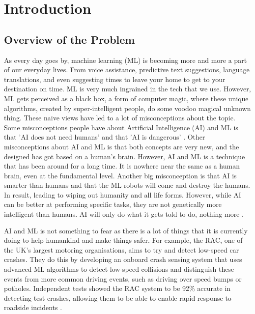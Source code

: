 \chapter{Introduction}
	\label{chap:intro}
	
	\section{Overview of the Problem}
		\label{sec:overview_of_problem}
		As every day goes by, machine learning (ML) is becoming more and more a part of our everyday lives. From voice assistance, predictive text suggestions, language translations, and even suggesting times to leave your home to get to your destination on time. ML is very much ingrained in the tech that we use. However, ML gets perceived as a black box, a form of computer magic, where these unique algorithms, created by super-intelligent people, do some voodoo magical unknown thing. These naive views have led to a lot of misconceptions about the topic. Some misconceptions people have about Artificial Intelligence (AI) and ML is that 'AI does not need humans' and that 'AI is dangerous' \cite{quora5misconcepts}. Other misconceptions about AI and ML is that both concepts are very new, and the designed has got based on a human's brain. However, AI and ML is a technique that has been around for a long time. It is nowhere near the same as a human brain, even at the fundamental level. Another big misconception is that AI is smarter than humans and that the ML robots will come and destroy the humans. In result, leading to wiping out humanity and all life forms. However, while AI can be better at performing specific tasks, they are not genetically more intelligent than humans. AI will only do what it gets told to do, nothing more \cite{quora5misconcepts}.
		
		AI and ML is not something to fear as there is a lot of things that it is currently doing to help humankind and make things safer. For example, the RAC, one of the UK's largest motoring organisations, aims to try and detect low-speed car crashes. They do this by developing an onboard crash sensing system that uses advanced ML algorithms to detect low-speed collisions and distinguish these events from more common driving events, such as driving over speed bumps or potholes. Independent tests showed the RAC system to be 92\% accurate in detecting test crashes, allowing them to be able to enable rapid response to roadside incidents \cite{matlanintrotoml}.
	
